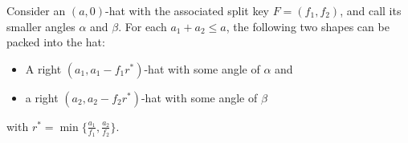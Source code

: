 \documentclass[%
    a4paper,              %
    style=screen,          %
    bibliography=totoc,   %
    nexus,                %
    lnum,                 %
    extramargin,          %
]{tubsbook}
\begin{document}

\begin{lemma}\label{th:hatsinhat}
    Consider an $(a,0)$-hat with the associated split key $F = (f_1, f_2)$, and call its smaller angles $\alpha$ and $\beta$.
    For each $a_1 + a_2 \le a$, the following two shapes can be packed into the hat:
    \begin{itemize}
        \item A right $(a_1,a_1-f_1 r^*)$-hat with some angle of $\alpha$ and
        \item a right $(a_2,a_2 - f_2 r^*)$-hat with some angle of $\beta$
    \end{itemize}
    with $r^* = \min\{\frac{a_1}{f_1}, \frac{a_2}{f_2}\}$.
\end{lemma}
\end{document}
